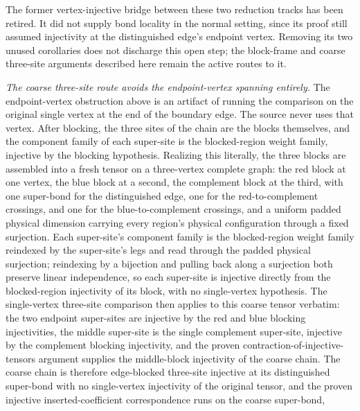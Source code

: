 \documentclass{article}
\begin{document}
\begin{enumerate}
          The former vertex-injective bridge between these two reduction tracks has been
          retired. It did not supply bond locality in the normal setting, since its proof
          still assumed injectivity at the distinguished edge's endpoint vertex. Removing
          its two unused corollaries does not discharge this open step; the block-frame and
          coarse three-site arguments described here remain the active routes to it.

          \emph{The coarse three-site route avoids the endpoint-vertex spanning
              entirely.} The endpoint-vertex obstruction above is an artifact of running
          the comparison on the original single vertex at the end of the boundary
          edge. The source never uses that vertex. After blocking, the three sites of
          the chain are the blocks themselves, and the component family of each
          super-site is the blocked-region weight family, injective by the blocking
          hypothesis. Realizing this literally, the three blocks are assembled into a
          fresh tensor on a three-vertex complete graph: the red block at one vertex,
          the blue block at a second, the complement block at the third, with one
          super-bond for the distinguished edge, one for the red-to-complement
          crossings, and one for the blue-to-complement crossings, and a uniform padded
          physical dimension carrying every region's physical configuration through a
          fixed surjection. Each super-site's component family is the blocked-region
          weight family reindexed by the super-site's legs and read through the padded
          physical surjection; reindexing by a bijection and pulling back along a
          surjection both preserve linear independence, so each super-site is injective
          directly from the blocked-region injectivity of its block, with no
          single-vertex hypothesis. The single-vertex three-site comparison then
          applies to this coarse tensor verbatim: the two endpoint super-sites are
          injective by the red and blue blocking injectivities, the middle super-site
          is the single complement super-site, injective by the complement blocking
          injectivity, and the proven contraction-of-injective-tensors argument
          supplies the middle-block injectivity of the coarse chain. The coarse chain
          is therefore edge-blocked three-site injective at its distinguished super-bond
          with no single-vertex injectivity of the original tensor, and the proven
          injective inserted-coefficient correspondence runs on the coarse super-bond,

\end{enumerate}
\end{document}
